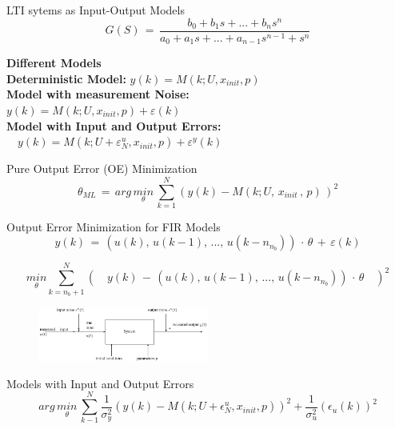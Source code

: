 LTI sytems as Input-Output Models
\begin{equation*}
G(S)\, =\, \frac { b_0 + b_1s+...+b_ns^n }{ a_0+a_1s+...+a_{n-1}s^{n-1}+s^n } 
\end{equation*}

\textbf{Different Models}\\
\textbf{Deterministic Model:} \(y(k)=M(k;U,{ x }_{ init },p)\) \\
\textbf{Model with measurement Noise:} \\ \(y(k)=M(k;U,{ x }_{ init },p)+\varepsilon(k)\) \\
\textbf{Model with Input and Output Errors:} \\ \( \quad y(k)=M(k;U+{\varepsilon  }_{ N }^{ u },{ x }_{ init },p)+{ { \varepsilon }^{ y } }(k)\)


Pure Output Error (OE) Minimization
\begin{equation*}
\theta _{ ML } \, =\, arg\, \underset { \theta  }{ min } \, \sum _{ k=1 }^{ N }{ (y(k)-M(k;U,\, x_{ init }\, ,\, p)\, )^{ 2 } }
\end{equation*}

Output Error Minimization for FIR Models
\begin{equation*}
y(k) \, = \, (u(k),\, u(k-1),\, ...,\, u(k-n_{n_b})) \, \cdot \, \theta \, + \, \varepsilon(k)
\end{equation*}

\begin{equation*}
\underset { \theta  }{ min } \sum _{ k=n_{ b }+1 }^{ N }{ (\quad y(k)\, -\, (u(k),\, u(k-1),\, ...,\, u(k-n_{ n_{ b } }))\, \cdot \, \theta \quad )^{ 2 } } 
\end{equation*}


\begin{figure}[H]
	\centering
  	\includegraphics[width=0.5\textwidth]{./model.pdf}
	\label{model}
\end{figure}
Models with Input and Output Errors
\begin{equation*}
arg \, \underset { \theta  }{ min } \, \sum _{ k-1 }^{ N }{ \frac { 1 }{ { \sigma  }_{ y }^{ 2 } }  } { (y(k)-M(k;U+{ \epsilon  }_{ N }^{ u },{ x }_{ init },p)) }^{ 2 }+\frac { 1 }{ { \sigma  }_{ u }^{ 2 } } { ({ \epsilon  }_{ u }(k)) }^{ 2 }
\end{equation*}


